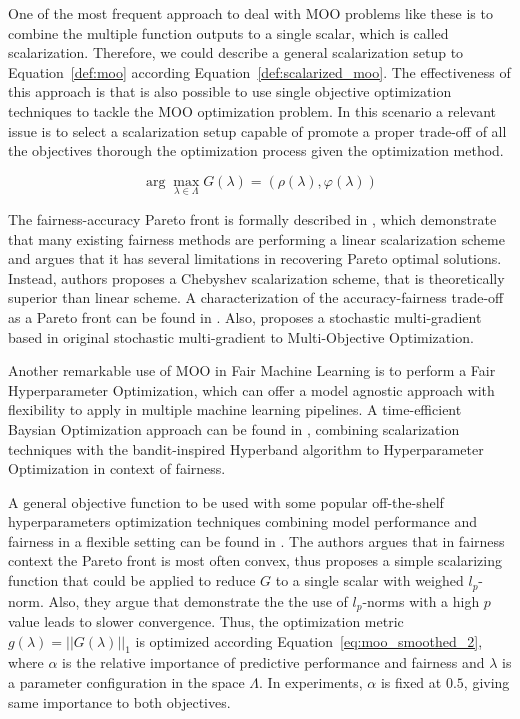 One of the most frequent approach to deal with MOO problems like these is to combine the multiple function outputs to a single scalar, which is called scalarization. Therefore, we could describe a general scalarization setup to Equation~\ref{def:moo} according Equation~\ref{def:scalarized_moo}. The effectiveness of this approach is that is also possible to use single objective optimization techniques to tackle the MOO optimization problem. In this scenario a relevant issue is to select a scalarization setup capable of promote a proper trade-off of all the objectives thorough the optimization process given the optimization method.

\begin{equation}\label{def:scalarized_moo}
\arg\max\limits_{\lambda\in\Lambda} G(\lambda) = (\rho(\lambda), \varphi(\lambda))
\end{equation}

The fairness-accuracy Pareto front is formally described in \cite{Wei2022}, which demonstrate that many existing fairness methods are performing a linear scalarization scheme and argues that it has several limitations in recovering Pareto optimal solutions. Instead, authors proposes a Chebyshev scalarization scheme, that is theoretically superior than linear scheme. A characterization of the accuracy-fairness trade-off as a Pareto front can be found in \cite{Liu2022}. Also, \cite{Mercier2018} proposes a stochastic multi-gradient based in original stochastic multi-gradient to Multi-Objective Optimization.

Another remarkable use of MOO in Fair Machine Learning is to perform a Fair Hyperparameter Optimization, which can offer a model agnostic approach with flexibility to apply in multiple machine learning pipelines. A time-efficient Baysian Optimization approach can be found in \cite{Schmucker2020}, combining scalarization techniques with the bandit-inspired Hyperband \citep{Li2016} algorithm to Hyperparameter Optimization in context of fairness.

A general objective function to be used with some popular off-the-shelf hyperparameters optimization techniques combining model performance and fairness in a flexible setting can be found in \cite{Cruz2021}. The authors argues that in fairness context the Pareto front is most often convex, thus proposes a simple scalarizing function that could be applied to reduce $G$ to a single scalar with weighed $l_p$-norm. Also, they argue that \cite{GIAGKIOZIS2015338} demonstrate the the  use  of $l_p$-norms with a high $p$ value leads to slower convergence. Thus, the optimization metric $g(\lambda) = ||G(\lambda)||_1$ is optimized according Equation~\ref{eq:moo_smoothed_2}, where $\alpha$ is the relative importance of predictive performance and fairness and $\lambda$ is a parameter configuration in the space $\Lambda$. In experiments, $\alpha$ is fixed at $0.5$, giving same importance to both objectives.

